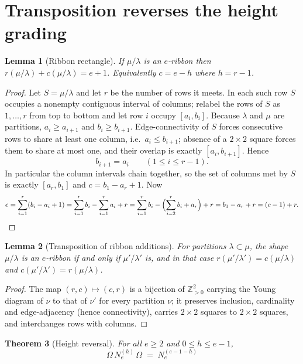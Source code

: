 \documentclass[11pt]{article}
\theoremstyle{plain}
\newtheorem{theorem}{Theorem}
\newtheorem{lemma}[theorem]{Lemma}
\theoremstyle{definition}
\newcommand{\Om}{\Omega}
\newcommand{\N}[1]{N_e^{(#1)}}
\begin{document}
\section{Transposition reverses the height grading}

\begin{lemma}[Ribbon rectangle]\label{lem:rc}
If $\mu/\lambda$ is an $e$-ribbon then $r(\mu/\lambda)+c(\mu/\lambda)=e+1$.
Equivalently $c=e-h$ where $h=r-1$.
\end{lemma}

\begin{proof}
Let $S=\mu/\lambda$ and let $r$ be the number of rows it meets.  In each such
row $S$ occupies a nonempty contiguous interval of columns; relabel the rows
of $S$ as $1,\dots,r$ from top to bottom and let row $i$ occupy $[a_i,b_i]$.
Because $\lambda$ and $\mu$ are partitions, $a_i\ge a_{i+1}$ and
$b_i\ge b_{i+1}$.  Edge-connectivity of $S$ forces consecutive rows to share
at least one column, i.e.\ $a_i\le b_{i+1}$; absence of a $2\times2$ square
forces them to share at most one, and their overlap is exactly
$[a_i,b_{i+1}]$.  Hence
\[
  b_{i+1}=a_i \qquad (1\le i\le r-1).
\]
In particular the column intervals chain together, so the set of columns met
by $S$ is exactly $[a_r,b_1]$ and $c=b_1-a_r+1$.  Now
\[
  e=\sum_{i=1}^{r}(b_i-a_i+1)
   =\sum_{i=1}^{r}b_i-\sum_{i=1}^{r}a_i+r
   =\sum_{i=1}^{r}b_i-\Bigl(\sum_{i=2}^{r}b_i+a_r\Bigr)+r
   =b_1-a_r+r=(c-1)+r . \qedhere
\]
\end{proof}

\begin{lemma}[Transposition of ribbon additions]\label{lem:transpose}
For partitions $\lambda\subset\mu$, the shape $\mu/\lambda$ is an $e$-ribbon
if and only if $\mu'/\lambda'$ is, and in that case
$r(\mu'/\lambda')=c(\mu/\lambda)$ and $c(\mu'/\lambda')=r(\mu/\lambda)$.
\end{lemma}

\begin{proof}
The map $(r,c)\mapsto(c,r)$ is a bijection of $\mathbb{Z}_{>0}^2$ carrying the
Young diagram of $\nu$ to that of $\nu'$ for every partition $\nu$; it
preserves inclusion, cardinality and edge-adjacency (hence connectivity),
carries $2\times2$ squares to $2\times2$ squares, and interchanges rows with
columns.
\end{proof}

\begin{theorem}[Height reversal]\label{thm:main}
For all $e\ge2$ and $0\le h\le e-1$,
\[
  \boxed{\;\Om\,\N{h}\,\Om \;=\; \N{e-1-h}\;}
\]
\end{theorem}
\end{document}
